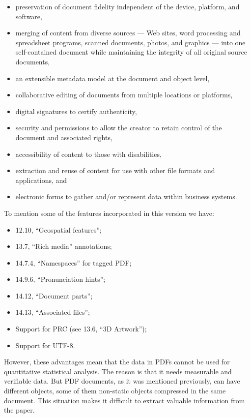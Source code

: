 \documentclass[
]{article}
\providecommand{\tightlist}{%
  \setlength{\itemsep}{0pt}\setlength{\parskip}{0pt}}
\begin{document}
\begin{itemize}
\tightlist
\item
  preservation of document fidelity independent of the device, platform,
  and software,
\item
  merging of content from diverse sources --- Web sites, word processing
  and spreadsheet programs, scanned documents, photos, and graphics ---
  into one self-contained document while maintaining the integrity of
  all original source documents,
\item
  an extensible metadata model at the document and object level,
\item
  collaborative editing of documents from multiple locations or
  platforms,
\item
  digital signatures to certify authenticity,
\item
  security and permissions to allow the creator to retain control of the
  document and associated rights,
\item
  accessibility of content to those with disabilities,
\item
  extraction and reuse of content for use with other file formats and
  applications, and
\item
  electronic forms to gather and/or represent data within business
  systems.
\end{itemize}

To mention some of the features incorporated in this version we have:

\begin{itemize}
\tightlist
\item
  12.10, ``Geospatial features'';
\item
  13.7, ``Rich media'' annotations;
\item
  14.7.4, ``Namespaces'' for tagged PDF;
\item
  14.9.6, ``Pronunciation hints'';
\item
  14.12, ``Document parts'';
\item
  14.13, ``Associated files'';
\item
  Support for PRC (see 13.6, ``3D Artwork'');
\item
  Support for UTF-8.
\end{itemize}

However, these advantages mean that the data in PDFs cannot be used for
quantitative statistical analysis. The reason is that it needs
measurable and verifiable data. But PDF documents, as it was mentioned
previously, can have different objects, some of them non-static objects
compressed in the same document. This situation makes it difficult to
extract valuable information from the paper.
\end{document}
